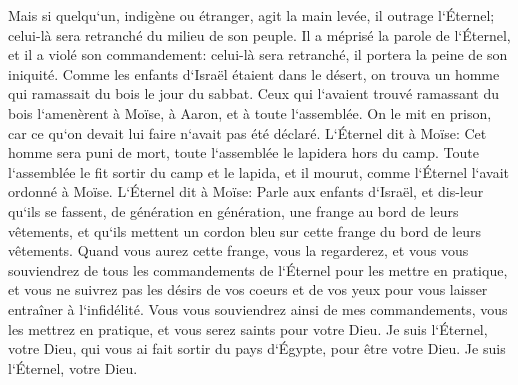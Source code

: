 \verse Mais si quelqu`un, indigène ou étranger, agit la main levée, il outrage l`Éternel; celui-là sera retranché du milieu de son peuple. 
\verse Il a méprisé la parole de l`Éternel, et il a violé son commandement: celui-là sera retranché, il portera la peine de son iniquité. 
\verse Comme les enfants d`Israël étaient dans le désert, on trouva un homme qui ramassait du bois le jour du sabbat. 
\verse Ceux qui l`avaient trouvé ramassant du bois l`amenèrent à Moïse, à Aaron, et à toute l`assemblée. 
\verse On le mit en prison, car ce qu`on devait lui faire n`avait pas été déclaré. 
\verse L`Éternel dit à Moïse: Cet homme sera puni de mort, toute l`assemblée le lapidera hors du camp. 
\verse Toute l`assemblée le fit sortir du camp et le lapida, et il mourut, comme l`Éternel l`avait ordonné à Moïse. 
\verse L`Éternel dit à Moïse: 
\verse Parle aux enfants d`Israël, et dis-leur qu`ils se fassent, de génération en génération, une frange au bord de leurs vêtements, et qu`ils mettent un cordon bleu sur cette frange du bord de leurs vêtements. 
\verse Quand vous aurez cette frange, vous la regarderez, et vous vous souviendrez de tous les commandements de l`Éternel pour les mettre en pratique, et vous ne suivrez pas les désirs de vos coeurs et de vos yeux pour vous laisser entraîner à l`infidélité. 
\verse Vous vous souviendrez ainsi de mes commandements, vous les mettrez en pratique, et vous serez saints pour votre Dieu. 
\verse Je suis l`Éternel, votre Dieu, qui vous ai fait sortir du pays d`Égypte, pour être votre Dieu. Je suis l`Éternel, votre Dieu. 

